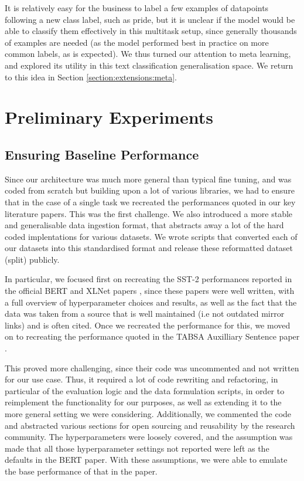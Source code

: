 It is relatively easy for the business to label a few examples of datapoints following a new class label, such as pride, but it is unclear if the model would be able to classify them effectively in this multitask setup, since generally thousands of examples are needed (as the model performed best in practice on more common labels, as is expected). We thus turned our attention to meta learning, and explored its utility in this text classification generalisation space. We return to this idea in Section \ref{section:extensions:meta}.

\section{Preliminary Experiments}
\subsection{Ensuring Baseline Performance}
Since our architecture was much more general than typical fine tuning, and was coded from scratch but building upon a lot of various libraries, we had to ensure that in the case of a single task we recreated the performances quoted in our key literature papers. This was the first challenge. We also introduced a more stable and generalisable data ingestion format, that abstracts away a lot of the hard coded implentations for various datasets. We wrote scripts that converted each of our datasets into this standardised format and release these reformatted dataset (split) publicly.

 In particular, we focused first on recreating the SST-2 performances reported in the official BERT and XLNet papers \cite{Devlin2018, Yang2019}, since these papers were well written, with a full overview of hyperparameter choices and results, as well as the fact that the data was taken from a source that is well maintained (i.e not outdated mirror links) and is often cited. Once we recreated the performance for this, we moved on to recreating the performance quoted in the TABSA Auxilliary Sentence paper \cite{Sun2019}.

This proved more challenging, since their code was uncommented and not written for our use case. Thus, it required a lot of code rewriting and refactoring, in particular of the evaluation logic and the data formulation scripts, in order to reimplement the functionality for our purposes, as well as extending it to the more general setting we were considering. Additionally, we commented the code and abstracted various sections for open sourcing and reusability by the research community. The hyperparameters were loosely covered, and the assumption was made that all those hyperparameter settings not reported were left as the defaults in the BERT paper. With these assumptions, we were able to emulate the base performance of that in the paper.

